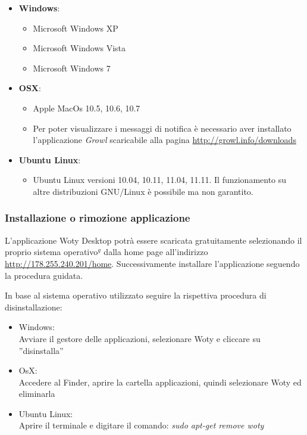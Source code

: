 \begin{itemize}
\item \textbf{Windows}:
	\begin{itemize}
	\item Microsoft Windows XP
	\item Microsoft Windows Vista
	\item Microsoft Windows 7
	\end{itemize}

\item \textbf{OSX}:
	\begin{itemize}
	\item Apple MacOs 10.5, 10.6, 10.7
	\item Per poter visualizzare i messaggi di notifica è necessario aver installato l'applicazione \textit{Growl} scaricabile alla pagina \url{http://growl.info/downloads}
	\end{itemize}

\item \textbf{Ubuntu Linux}:
	\begin{itemize}
	\item Ubuntu Linux versioni 10.04, 10.11, 11.04, 11.11. Il funzionamento su altre distribuzioni GNU/Linux è possibile ma non garantito.
	\end{itemize}


\end{itemize}




\subsubsection{Installazione o rimozione applicazione}
L'applicazione Woty Desktop potrà essere scaricata gratuitamente selezionando il proprio sistema operativo$^g$ dalla home page all'indirizzo \url{http://178.255.240.201/home}.
Successivamente installare l'applicazione seguendo la procedura guidata.


In base al sistema operativo utilizzato seguire la rispettiva procedura di disinstallazione:

\begin{itemize}
\item Windows:\\
Avviare il gestore delle applicazioni, selezionare Woty e cliccare su ''disinstalla''

\item OsX:\\
Accedere al Finder, aprire la cartella applicazioni, quindi selezionare Woty ed eliminarla

\item Ubuntu Linux:\\
Aprire il terminale e digitare il comando: \textit{sudo apt-get remove woty}

\end{itemize}




